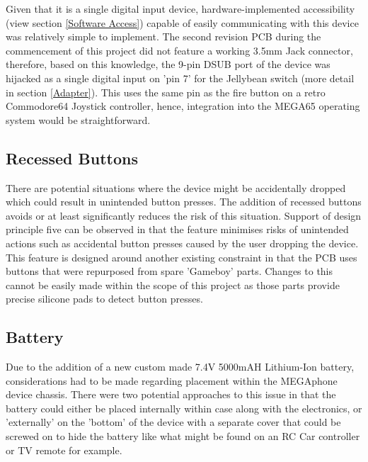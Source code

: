 Given that it is a single digital input device, hardware-implemented accessibility (view section \ref{Software Access}) capable of easily communicating with this device was relatively simple to implement. 
The second revision PCB during the commencement of this project did not feature a working 3.5mm Jack connector, therefore, based on this knowledge, the 9-pin DSUB port of the device was hijacked as a single digital input on 'pin 7' for the Jellybean switch (more detail in section \ref{Adapter}). 
This uses the same pin as the fire button on a retro Commodore64 Joystick controller, hence, integration into the MEGA65 operating system would be straightforward.

\subsection{Recessed Buttons}

There are potential situations where the device might be accidentally dropped which could result in unintended button presses.
The addition of recessed buttons avoids or at least significantly reduces the risk of this situation.
Support of design principle five can be observed in that the feature minimises risks of unintended actions such as accidental button presses caused by the user dropping the device.
This feature is designed around another existing constraint in that the PCB uses buttons that were repurposed from spare 'Gameboy' parts.
Changes to this cannot be easily made within the scope of this project as those parts provide precise silicone pads to detect button presses.

\subsection{Battery} \label{Battery}

Due to the addition of a new custom made 7.4V 5000mAH Lithium-Ion battery, considerations had to be made regarding placement within the MEGAphone device chassis.
There were two potential approaches to this issue in that the battery could either be placed internally within case along with the electronics, or 'externally' on the 'bottom' of the device with a separate cover that could be screwed on to hide the battery like what might be found on an RC Car controller or TV remote for example.

